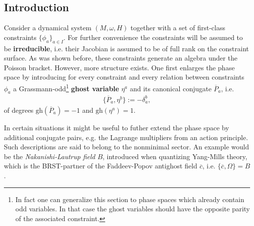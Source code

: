 \subsection{Introduction}

    Consider a dynamical system $(M,\omega,H)$ together with a set of first-class constraints $\{\phi_a\}_{a\in I}$. For further convenience the constraints will be assumed to be \textbf{irreducible}, i.e. their Jacobian is assumed to be of full rank on the constraint surface. As was shown before, these constraints generate an algebra under the Poisson bracket. However, more structure exists. One first enlarges the phase space by introducing for every constraint and every relation between constraints $\phi_a$ a Grassmann-odd\footnote{In fact one can generalize this section to phase spaces which already contain odd variables. In that case the ghost variables should have the opposite parity of the associated constraint.} \textbf{ghost variable} $\eta^a$ and its canonical conjugate $\overline{P}_a$, i.e.
    \begin{gather}
        \{\overline{P}_a,\eta^b\} := -\delta^b_a,
    \end{gather}
    of degrees $\text{gh}(\overline{P}_a) = -1$ and $\text{gh}(\eta^a) = 1$.
    \begin{remark}
        In certain situations it might be useful to futher extend the phase space by additional conjugate pairs, e.g. the Lagrange multipliers from an action principle. Such descriptions are said to belong to the nonminimal sector. An example would be the \textit{Nakanishi-Lautrup field} $B$, introduced when quantizing Yang-Mills theory, which is the BRST-partner of the Faddeev-Popov antighost field $\overline{c}$, i.e. $\{\overline{c},\Omega\}=B$.
    \end{remark}

